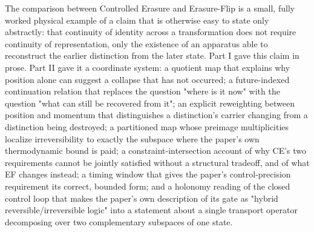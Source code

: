 \documentclass[11pt]{article}
\begin{document}
The comparison between Controlled Erasure and Erasure-Flip is a small, fully worked physical example of a claim that is otherwise easy to state only abstractly: that continuity of identity across a transformation does not require continuity of representation, only the existence of an apparatus able to reconstruct the earlier distinction from the later state. Part I gave this claim in prose. Part II gave it a coordinate system: a quotient map that explains why position alone can suggest a collapse that has not occurred; a future-indexed continuation relation that replaces the question "where is it now" with the question "what can still be recovered from it"; an explicit reweighting between position and momentum that distinguishes a distinction's carrier changing from a distinction being destroyed; a partitioned map whose preimage multiplicities localize irreversibility to exactly the subspace where the paper's own thermodynamic bound is paid; a constraint-intersection account of why CE's two requirements cannot be jointly satisfied without a structural tradeoff, and of what EF changes instead; a timing window that gives the paper's control-precision requirement its correct, bounded form; and a holonomy reading of the closed control loop that makes the paper's own description of its gate as "hybrid reversible/irreversible logic" into a statement about a single transport operator decomposing over two complementary subspaces of one state.
\end{document}
